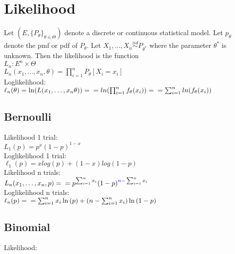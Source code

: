 \section{Likelihood}

Let $(E, \{ P_\theta \} _{\theta \in \Theta })$ denote a discrete or continuous statistical model. Let $p_\theta$ denote the pmf or pdf of $P_\theta$. Let $X_1, \ldots , X_ n \stackrel{iid}{\sim } P_{\theta ^*}$ where the parameter $\theta ^*$  is unknown. Then the likelihood is the function \\

$\displaystyle  L_ n: E^ n \times \Theta$\\
$L_ n(x_1, \ldots , x_ n, \theta) = \prod _{i = 1}^ n P_{\theta}[X_i=x_i] $\\

Loglikelihood:\\
$\ell_n (\theta ) = \ln (L(x_1,\ldots, x_n \theta ))=\\
= ln (\prod _{i = 1}^ n f_\theta (x_i))=\\ 
= \sum _{i = 1}^ n ln(f_\theta(x_i))$\\

\subsection*{Bernoulli}

Likelihood 1 trial:\\
$L_ 1(p) = p^x (1-p)^{1-x}$\\

Loglikelihood 1 trial:\\
$\ell_1(p) = x log(p) + (1-x) log (1-p)$\\


Likelihood n trials:\\

$L_ n(x_1, \ldots , x_ n, p) =\\
= p^{\sum _{i = 1}^ n x_ i} (1 -p)^{{\color{blue}{n - }} \sum _{i = 1}^ n x_ i}$ \\

Loglikelihood n trials:\\

$\ell_n (p) = \\ = \sum _{i=1}^{n}x_{{i}}\ln  \left( p \right) + \left( n-\sum _{i=1}^{n}
x_{{i}} \right) \ln  \left( 1-p \right)$\\

\subsection*{Binomial}
Likelihood:\\

